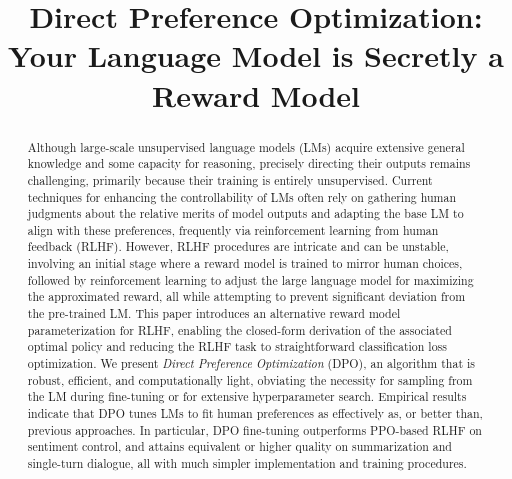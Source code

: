 \title{Direct Preference Optimization: Your Language Model is Secretly a Reward Model}

\begin{abstract}
Although large-scale unsupervised language models (LMs) acquire extensive general knowledge and some capacity for reasoning, precisely directing their outputs remains challenging, primarily because their training is entirely unsupervised. Current techniques for enhancing the controllability of LMs often rely on gathering human judgments about the relative merits of model outputs and adapting the base LM to align with these preferences, frequently via reinforcement learning from human feedback (RLHF). However, RLHF procedures are intricate and can be unstable, involving an initial stage where a reward model is trained to mirror human choices, followed by reinforcement learning to adjust the large language model for maximizing the approximated reward, all while attempting to prevent significant deviation from the pre-trained LM. This paper introduces an alternative reward model parameterization for RLHF, enabling the closed-form derivation of the associated optimal policy and reducing the RLHF task to straightforward classification loss optimization. We present \textit{Direct Preference Optimization} (DPO), an algorithm that is robust, efficient, and computationally light, obviating the necessity for sampling from the LM during fine-tuning or for extensive hyperparameter search. Empirical results indicate that DPO tunes LMs to fit human preferences as effectively as, or better than, previous approaches. In particular, DPO fine-tuning outperforms PPO-based RLHF on sentiment control, and attains equivalent or higher quality on summarization and single-turn dialogue, all with much simpler implementation and training procedures.
\end{abstract}

